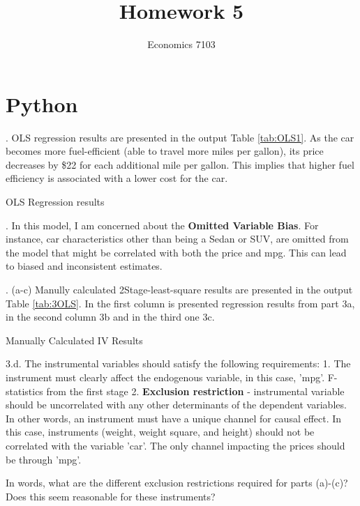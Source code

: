 \documentclass{article}
\title{Homework 5}
\author{Economics 7103}
\begin{document}
  
\maketitle

\section{Python}
. OLS regression results are presented in the output Table \ref{tab:OLS1}. As the car becomes more fuel-efficient (able to travel more miles per gallon), its price decreases by \$22 for each additional mile per gallon. This implies that higher fuel efficiency is associated with a lower cost for the car.

\begin{table}[h]
    \centering
    
    \caption{OLS Regression results}
    \label{tab:OLS1}
\end{table}

. In this model, I am concerned about the \textbf{Omitted Variable Bias}. For instance, car characteristics other than being a Sedan or SUV, are omitted from the model that might be correlated with both the price and mpg. This can lead to biased and inconsistent estimates. 

\clearpage

. (a-c) Manully calculated 2Stage-least-square results are presented in the output Table \ref{tab:3OLS}. In the first column is presented regression results from part 3a, in the second column 3b and in the third one 3c. 

\begin{table}[h]
    \centering
    
    \caption{Manually Calculated IV Results}
    \label{tab:3OLS}
\end{table}

\noindent 3.d. The instrumental variables should satisfy the following requirements: 
1. The instrument must clearly affect the endogenous variable, in this case, 'mpg'. F-statistics from the first stage 
2. \textbf{Exclusion restriction} - instrumental variable should be uncorrelated with any other determinants of the dependent variables. In other words, an instrument must have a unique channel for causal effect. In this case, instruments (weight, weight square, and height) should not be correlated with the variable 'car'. The only channel impacting the prices should be through 'mpg'.

In words, what are the different exclusion restrictions required for parts (a)-(c)? Does this seem reasonable for these instruments?
\end{document}
